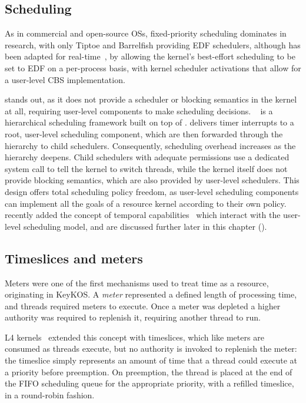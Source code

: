 \subsection{Scheduling}

As in commercial and open-source \glspl{OS}, fixed-priority scheduling dominates in research, with
only Tiptoe and Barrelfish providing \gls{EDF} schedulers, although \minix has been adapted for 
real-time~\citep{Mancina_LFHGT_09}, by allowing the kernel's best-effort scheduling to be
set to \gls{EDF} on a per-process basis, with kernel scheduler activations that allow for a
user-level \gls{CBS} implementation.    

\composite stands out, as it does not provide a scheduler or blocking semantics in the kernel at all,
requiring user-level
components to make scheduling decisions. \hires~\citep{Parmer_West_11} is a hierarchical scheduling framework built on top
of \composite. 
 \hires delivers timer interrupts to a root, user-level scheduling component, which are then forwarded
through the hierarchy to child schedulers.  Consequently, scheduling overhead increases as the
hierarchy deepens.  Child schedulers with adequate permissions use a dedicated system call to tell
the kernel to switch threads, while the kernel itself does not provide blocking semantics, which are also
provided by user-level schedulers.  This design offers total scheduling policy freedom, as
user-level scheduling components can implement all the goals of a resource kernel according to
their own policy. \composite recently added the concept of temporal capabilities~\citep{Gadepalli_GBKP_17} which interact with
the user-level scheduling model, and are discussed further later in this chapter ().

\subsection{Timeslices and meters}
\label{s:timeslices-and-meters}

Meters were one of the first mechanisms used to treat time as a resource, originating 
in KeyKOS. A \emph{meter} represented a
defined length of processing time, and threads required meters to execute. Once a meter was
depleted a higher authority was required to replenish it, requiring another thread to run.

L4 kernels~\citep{Elphinstone_Heiser_13} extended this concept with timeslices, 
which like meters are consumed as threads execute, but no
authority is invoked to replenish the meter: the timeslice simply represents an amount of time 
that a thread could execute at a priority before preemption. 
On preemption, the thread is placed at the end of
the \gls{FIFO} scheduling queue for the appropriate priority, with a refilled timeslice, in a
round-robin fashion. 

